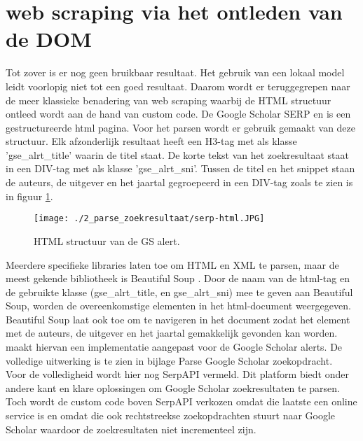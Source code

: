 \section{web scraping via het ontleden van de DOM}
Tot zover is er nog geen bruikbaar resultaat. Het gebruik van een lokaal model leidt voorlopig niet tot een goed resultaat. Daarom wordt er teruggegrepen naar de meer klassieke benadering van web scraping waarbij de HTML structuur ontleed wordt aan de hand van custom code.
De Google Scholar SERP en is een gestructureerde html pagina. Voor het parsen wordt er gebruik gemaakt van deze structuur.
Elk afzonderlijk resultaat heeft een H3-tag met als klasse 'gse\_alrt\_title' waarin de titel staat. De korte tekst van het zoekresultaat staat in een DIV-tag met als klasse 'gse\_alrt\_sni'. Tussen de titel en het snippet staan de auteurs, de uitgever en het jaartal gegroepeerd in een DIV-tag zoals te zien is in figuur \ref{fig:serp-html}.
\begin{figure}
    \centering
    \texttt{[image: ./2\_parse\_zoekresultaat/serp-html.JPG]}
    \caption[HTML structuur van de GS alert.]{\label{fig:serp-html}HTML structuur van de GS alert.}
\end{figure}
\FloatBarrier
Meerdere specifieke libraries laten toe om HTML en XML te parsen, maar de meest gekende bibliotheek is Beautiful Soup \autocite{Soup2025}. Door de naam van de html-tag en de gebruikte klasse (gse\_alrt\_title, en gse\_alrt\_sni) mee te geven aan Beautiful Soup, worden de overeenkomstige elementen in het html-document weergegeven. Beautiful Soup laat ook toe om te navigeren in het document zodat het element met de auteurs, de uitgever en het jaartal gemakkelijk gevonden kan worden.
\textcite{Depaepeollama2025} maakt hiervan een implementatie aangepast voor de Google Scholar alerts. De volledige uitwerking is te zien in bijlage Parse Google Scholar zoekopdracht.\\
Voor de volledigheid wordt hier nog SerpAPI \autocite{Serpapi2025} vermeld. Dit platform biedt onder andere kant en klare oplossingen om Google Scholar zoekresultaten te parsen. Toch wordt de custom code boven SerpAPI verkozen omdat die laatste een online service is en omdat die ook rechtstreekse zoekopdrachten stuurt naar Google Scholar waardoor de zoekresultaten niet incrementeel zijn.
